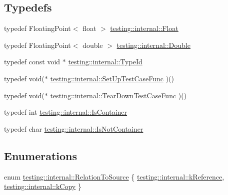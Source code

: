 \subsection*{Typedefs}
\begin{DoxyCompactItemize}
\item 
typedef Floating\+Point$<$ float $>$ \hyperlink{namespacetesting_1_1internal_a02e1981f5ff70609e6ac06e006ff519a}{testing\+::internal\+::\+Float}
\item 
typedef Floating\+Point$<$ double $>$ \hyperlink{namespacetesting_1_1internal_a66a7579b1893b260c31dad577f7a5c48}{testing\+::internal\+::\+Double}
\item 
typedef const void $\ast$ \hyperlink{namespacetesting_1_1internal_ab1114197d3c657d8b7f8e0c5caa12d00}{testing\+::internal\+::\+Type\+Id}
\item 
typedef void($\ast$ \hyperlink{namespacetesting_1_1internal_ada14d66b5460b20e09071f51b9885c8d}{testing\+::internal\+::\+Set\+Up\+Test\+Case\+Func} )()
\item 
typedef void($\ast$ \hyperlink{namespacetesting_1_1internal_aad40244621b68546f3b830696225bf9b}{testing\+::internal\+::\+Tear\+Down\+Test\+Case\+Func} )()
\item 
typedef int \hyperlink{namespacetesting_1_1internal_ad8f0c2883245f1df2a53618a49f0deb3}{testing\+::internal\+::\+Is\+Container}
\item 
typedef char \hyperlink{namespacetesting_1_1internal_abf080521ce135deb510e0a7830fd3d33}{testing\+::internal\+::\+Is\+Not\+Container}
\end{DoxyCompactItemize}
\subsection*{Enumerations}
\begin{DoxyCompactItemize}
\item 
enum \hyperlink{namespacetesting_1_1internal_aec4f0eeb60b6b8af8dcf979578bbf3bb}{testing\+::internal\+::\+Relation\+To\+Source} \{ \hyperlink{namespacetesting_1_1internal_aec4f0eeb60b6b8af8dcf979578bbf3bba75535e620e7496a433bf008ea81358a1}{testing\+::internal\+::k\+Reference}, 
\hyperlink{namespacetesting_1_1internal_aec4f0eeb60b6b8af8dcf979578bbf3bba272b78aee8068aa2392dbdcf69dfe3a4}{testing\+::internal\+::k\+Copy}
 \}
\end{DoxyCompactItemize}
